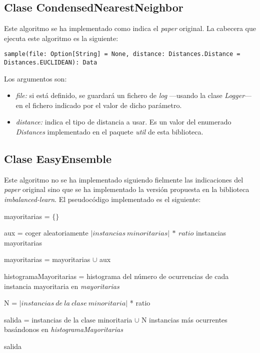 \subsection{Clase CondensedNearestNeighbor} \label{subsec:impl_condensednearestneighbor}

Este algoritmo se ha implementado como indica el \textit{paper} original. La cabecera que ejecuta este algoritmo es la siguiente:

\begin{lstlisting}[frame=single, basicstyle=\scriptsize, breaklines=true]
sample(file: Option[String] = None, distance: Distances.Distance = Distances.EUCLIDEAN): Data
\end{lstlisting}

Los argumentos son:

\begin{itemize}
    \item \textit{file:} si está definido, se guardará un fichero de \textit{log} —usando la clase \textit{Logger}— en el fichero indicado por el valor de dicho parámetro.
    \item \textit{distance:} indica el tipo de distancia a usar. Es un valor del enumerado \textit{Distances} implementado en el paquete \textit{util} de esta biblioteca.
\end{itemize}

\subsection{Clase EasyEnsemble} \label{subsec:impl_easyensemble}

Este algoritmo no se ha implementado siguiendo fielmente las indicaciones del \textit{paper} original sino que se ha implementado la versión propuesta en la biblioteca \textit{imbalanced-learn}. El pseudocódigo implementado es el siguiente:

\begin{codigo}
\begin{algorithmic}[1] \label{pseudocode:bc}
\State mayoritarias = $\{\}$
\State \parbox[t]{305pt}{aux = coger aleatoriamente $\left | instancias\ minoritarias \right | \ *\ ratio$ instancias mayoritarias\strut}
\State mayoritarias = mayoritarias $\cup$ aux
\EndFor
\State \parbox[t]{305pt}{histogramaMayoritarias = histograma del número de ocurrencias de cada instancia mayoritaria en \textit{mayoritarias} \strut}
\State \parbox[t]{305pt}{N = $\left | instancias\ de\ la\ clase\ minoritaria \right |$ * ratio\strut}
\State \parbox[t]{305pt}{salida = instancias de la clase minoritaria $\cup$ N instancias más ocurrentes basándonos en \textit{histogramaMayoritarias} \strut}
\State \Return salida
\EndFunction 
\end{algorithmic}
\end{codigo}


